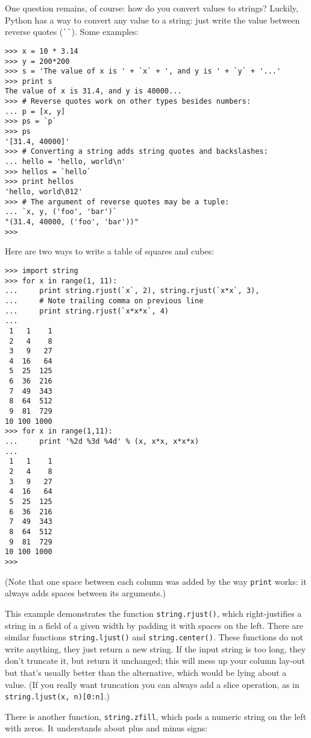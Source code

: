 One question remains, of course: how do you convert values to strings?
Luckily, Python has a way to convert any value to a string: just write
the value between reverse quotes (\verb/``/).  Some examples:

\bcode\begin{verbatim}
>>> x = 10 * 3.14
>>> y = 200*200
>>> s = 'The value of x is ' + `x` + ', and y is ' + `y` + '...'
>>> print s
The value of x is 31.4, and y is 40000...
>>> # Reverse quotes work on other types besides numbers:
... p = [x, y]
>>> ps = `p`
>>> ps
'[31.4, 40000]'
>>> # Converting a string adds string quotes and backslashes:
... hello = 'hello, world\n'
>>> hellos = `hello`
>>> print hellos
'hello, world\012'
>>> # The argument of reverse quotes may be a tuple:
... `x, y, ('foo', 'bar')`
"(31.4, 40000, ('foo', 'bar'))"
>>>
\end{verbatim}\ecode
%
Here are two ways to write a table of squares and cubes:

\bcode\begin{verbatim}
>>> import string
>>> for x in range(1, 11):
...     print string.rjust(`x`, 2), string.rjust(`x*x`, 3),
...     # Note trailing comma on previous line
...     print string.rjust(`x*x*x`, 4)
...
 1   1    1
 2   4    8
 3   9   27
 4  16   64
 5  25  125
 6  36  216
 7  49  343
 8  64  512
 9  81  729
10 100 1000
>>> for x in range(1,11):
...     print '%2d %3d %4d' % (x, x*x, x*x*x)
... 
 1   1    1
 2   4    8
 3   9   27
 4  16   64
 5  25  125
 6  36  216
 7  49  343
 8  64  512
 9  81  729
10 100 1000
>>>
\end{verbatim}\ecode
%
(Note that one space between each column was added by the way {\tt print}
works: it always adds spaces between its arguments.)

This example demonstrates the function {\tt string.rjust()}, which
right-justifies a string in a field of a given width by padding it with
spaces on the left.  There are similar functions {\tt string.ljust()}
and {\tt string.center()}.  These functions do not write anything, they
just return a new string.  If the input string is too long, they don't
truncate it, but return it unchanged; this will mess up your column
lay-out but that's usually better than the alternative, which would be
lying about a value.  (If you really want truncation you can always add
a slice operation, as in {\tt string.ljust(x,~n)[0:n]}.)

There is another function, {\tt string.zfill}, which pads a numeric
string on the left with zeros.  It understands about plus and minus
signs:

